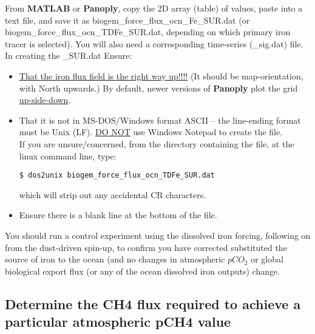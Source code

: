 \begin{enumerate}[noitemsep]
From \textbf{MATLAB} or \textbf{Panoply}, copy the 2D array (table) of values, paste into a text file, and save it as \textsf{\footnotesize biogem\_force\_flux\_ocn\_Fe\_SUR.dat} (or \textsf{\footnotesize biogem\_force\_flux\_ocn\_TDFe\_SUR.dat}, depending on which primary iron tracer is selected). You will also need a corresponding time-series (\textsf{\footnotesize *\_sig.dat}) file. In creating the \textsf{\footnotesize *\_SUR.dat} Ensure:
\vspace{1mm}
\begin{itemize}[noitemsep]
\item \uline{That the iron flux field is the right way up!!!!} (It should be map-orientation, with North upwards.) By default, newer versions of \textbf{Panoply} plot the grid \uline{up-side-down}.
\item That it is not in MS-DOS/Windows format ASCII -- the line-ending format must be Unix (LF). \uline{DO NOT} use Windows Notepad to create the file.
\\If you are unsure/concerned, from the directory containing the file, at the linux command line, type:
\vspace{-1mm}\begin{verbatim}
$ dos2unix biogem_force_flux_ocn_TDFe_SUR.dat
\end{verbatim}\vspace{-1mm}
which will strip out any accidental CR characters.
\item Ensure there is a blank line at the bottom of the file.
\end{itemize}
\vspace{1mm}
You should run a control experiment using the dissolved iron forcing, following on from the dust-driven spin-up, to confirm you have corrected substituted the source of iron to the ocean (and no changes in atmospheric \(pCO_{2}\) or global biological export flux (or any of the ocean dissolved iron outputs) change.
\end{enumerate}
\vspace{1mm}

%
\newpage
\subsection*{Determine the CH4 flux required to achieve a particular atmospheric pCH4 value}
\vspace{1mm}


